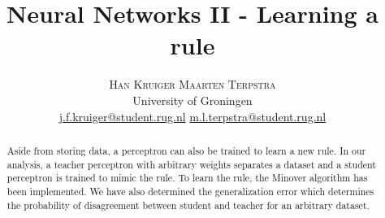 \documentclass[twoside]{article}
\title{\vspace{-15mm}\fontsize{24pt}{10pt}\selectfont\textbf{Neural Networks II - Learning a rule}} %
\author{
\large
\hspace{6mm}\textsc{Han Kruiger} \hspace{12mm} \textsc{Maarten Terpstra}\\[2mm] %
\normalsize University of Groningen \\ %
\normalsize \href{mailto:j.f.kruiger@student.rug.nl}{j.f.kruiger@student.rug.nl} \hspace{5mm} \normalsize \href{mailto:m.l.terpstra@student.rug.nl}{m.l.terpstra@student.rug.nl} %
\vspace{-5mm}
}
\date{}
\begin{document}
\maketitle %

\thispagestyle{fancy} %


\begin{abstract}
\noindent Aside from storing data, a perceptron can also be trained to learn a new rule.
In our analysis, a teacher perceptron with arbitrary weights separates a dataset and a student perceptron is trained to mimic the rule.
To learn the rule, the Minover algorithm has been implemented.
We have also determined the generalization error which determines the probability of disagreement between student and teacher for an arbitrary dataset. 
\end{abstract}

\end{document}
